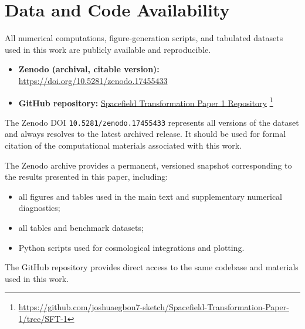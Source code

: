 \documentclass[12pt]{article}
\begin{document}
\section*{Data and Code Availability}
\label{sec:data_code}

All numerical computations, figure-generation scripts, and tabulated datasets 
used in this work are publicly available and reproducible.

\begin{itemize}
\item \textbf{Zenodo (archival, citable version):}  
\url{https://doi.org/10.5281/zenodo.17455433}

\item \textbf{GitHub repository:}
\href{https://github.com/joshuaegbon7-sketch/Spacefield-Transformation-Paper-1/tree/SFT-1}
{Spacefield Transformation Paper 1 Repository}
\footnote{\url{https://github.com/joshuaegbon7-sketch/Spacefield-Transformation-Paper-1/tree/SFT-1}}

\end{itemize}

The Zenodo DOI \texttt{10.5281/zenodo.17455433} represents all versions of the 
dataset and always resolves to the latest archived release. It should be used 
for formal citation of the computational materials associated with this work.

The Zenodo archive provides a permanent, versioned snapshot corresponding to 
the results presented in this paper, including:
\begin{itemize}
\item all figures and tables used in the main text and supplementary numerical diagnostics;
\item all tables and benchmark datasets;
\item Python scripts used for cosmological integrations and plotting.
\end{itemize}

The GitHub repository provides direct access to the same codebase and materials 
used in this work.

\newpage


\end{document}
